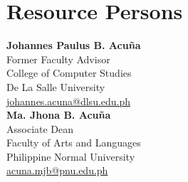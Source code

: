 \chapter{Resource Persons}
\newcommand{\resperson}[4]{\textbf{#1} \\ #2 \\ #3 \\ \url{#4}\vspace{2em}\\}

\resperson{Johannes Paulus B. Acuña}{Former Faculty Advisor}{College of Computer Studies\\De La Salle University}{johannes.acuna@dlsu.edu.ph}
\resperson{Ma. Jhona B. Acuña}{Associate Dean}{Faculty of Arts and 
Languages\\Philippine Normal University}{acuna.mjb@pnu.edu.ph}